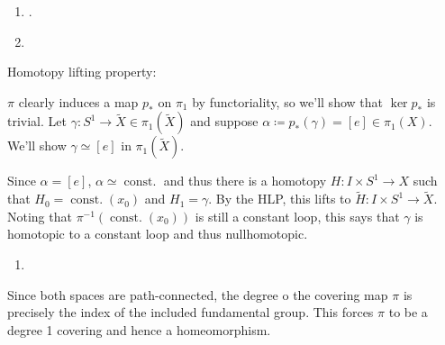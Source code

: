 \begin{solution}

\hfill

\begin{concept}

\hfill

\end{concept}

\begin{enumerate}
\def\labelenumi{\alph{enumi}.}
\item
  .
\item
\end{enumerate}

Homotopy lifting property:

\begin{center}
\end{center}

\(\pi\) clearly induces a map \(p_*\) on \(\pi_1\) by functoriality, so
we'll show that \(\ker p_*\) is trivial. Let
\(\gamma: S^1 \to \tilde X \in \pi_1(\tilde X)\) and suppose
\(\alpha \coloneqq p_*(\gamma) = [e] \in \pi_1(X)\). We'll show
\(\gamma \simeq[e]\) in \(\pi_1(\tilde X)\).

Since \(\alpha = [e]\), \(\alpha \simeq{\operatorname{const.}}\) and
thus there is a homotopy \(H: I\times S^1 \to X\) such that
\(H_0 = {\operatorname{const.}}(x_0)\) and \(H_1 = \gamma\). By the HLP,
this lifts to \(\tilde H: I\times S^1 \to \tilde X\). Noting that
\(\pi^{-1}({\operatorname{const.}}(x_0))\) is still a constant loop,
this says that \(\gamma\) is homotopic to a constant loop and thus
nullhomotopic.

\begin{enumerate}
\def\labelenumi{\alph{enumi}.}
\setcounter{enumi}{2}
\tightlist
\item
\end{enumerate}

Since both spaces are path-connected, the degree o the covering map
\(\pi\) is precisely the index of the included fundamental group. This
forces \(\pi\) to be a degree 1 covering and hence a homeomorphism.

\end{solution}

